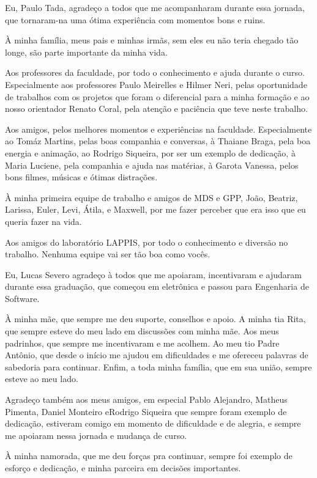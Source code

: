 Eu, Paulo Tada, agradeço a todos que me acompanharam durante essa jornada,
que tornaram-na uma ótima experiência com momentos bons e ruins.

À minha família, meus pais e minhas irmãs, sem eles eu não teria chegado tão
longe, são parte importante da minha vida.

Aos professores da faculdade, por todo o conhecimento e ajuda durante o curso. Especialmente
aos professores Paulo Meirelles e Hilmer Neri, pelas oportunidade de trabalhos com os
projetos que foram o diferencial para a minha formação e ao nosso orientador Renato Coral,
pela atenção e paciência que teve neste trabalho.

Aos amigos, pelos melhores momentos e experiências na faculdade. Especialmente
ao Tomáz Martins, pelas boas companhia e conversas, à Thaiane Braga, pela boa energia
e animação, ao Rodrigo Siqueira, por ser um exemplo de dedicação, à
Maria Luciene, pela companhia e ajuda nas matérias, à Garota Vanessa, pelos bons filmes,
músicas e ótimas distrações.

À minha primeira equipe de trabalho e amigos de MDS e GPP, João, Beatriz, Larissa, Euler,
Levi, Átila, e Maxwell, por me fazer perceber que era isso que eu queria fazer na vida.

Aos amigos do laboratório LAPPIS, por todo o conhecimento e diversão no trabalho.
Nenhuma equipe vai ser tão boa como vocês.

Eu, Lucas Severo agradeço à todos que me apoiaram, incentivaram e ajudaram
durante essa graduação, que começou em eletrônica e passou para Engenharia de 
Software.

À minha mãe, que sempre me deu suporte, conselhos e apoio. A minha tia Rita, que
sempre esteve do meu lado em discussões com minha mãe. Aos meus padrinhos, que
sempre me incentivaram e me acolhem. Ao meu tio Padre Antônio, que desde o início
me ajudou em dificuldades e me ofereceu palavras de sabedoria para continuar.
Enfim, a toda minha família, que em sua união, sempre esteve ao meu lado.

Agradeço também aos meus amigos, em especial Pablo Alejandro, Matheus Pimenta, 
Daniel Monteiro eRodrigo Siqueira que sempre foram exemplo de dedicação, estiveram comigo em
momento de dificuldade e de alegria, e sempre me apoiaram nessa jornada e mudança
de curso.

À minha namorada, que me deu forças pra continuar, sempre foi exemplo de esforço
e dedicação, e minha parceira em decisões importantes.


